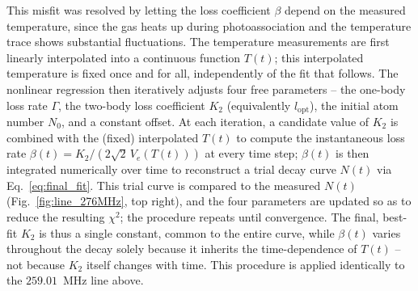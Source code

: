 This misfit was resolved by letting the loss coefficient $\beta$ depend on the
measured temperature, since the gas heats up during photoassociation and the
temperature trace shows substantial fluctuations. The temperature measurements
are first linearly interpolated into a continuous function $T(t)$; this
interpolated temperature is fixed once and for all, independently of the fit that
follows. The nonlinear regression then iteratively adjusts four free parameters
-- the one-body loss rate $\Gamma$, the two-body loss coefficient $K_2$
(equivalently $l_{\text{opt}}$), the initial atom number $N_0$, and a constant
offset. At each iteration, a candidate value of $K_2$ is combined with the
(fixed) interpolated $T(t)$ to compute the instantaneous loss rate
$\beta(t) = K_2/(2\sqrt{2}\,V_e(T(t)))$ at every time step; $\beta(t)$ is then
integrated numerically over time to reconstruct a trial decay curve $N(t)$ via
Eq.~\ref{eq:final_fit}. This trial curve is compared to the measured $N(t)$
(Fig.~\ref{fig:line_276MHz}, top right), and
the four parameters are updated so as to reduce the resulting $\chi^2$; the
procedure repeats until convergence. The final, best-fit $K_2$ is thus a single
constant, common to the entire curve, while $\beta(t)$ varies throughout the
decay solely because it inherits the time-dependence of $T(t)$ -- not because
$K_2$ itself changes with time. This procedure is applied identically to the
$259.01$~MHz line above.

